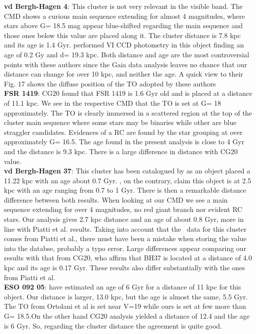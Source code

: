 \documentclass[draft]{aa}
\begin{document}
  \textbf{vd Bergh-Hagen 4}: This cluster is not very relevant in the visible
  band. The CMD shows a curious main sequence extending for almost 4 magnitudes,
  where stars above G= 18.5 mag appear blue-shifted regarding the main sequence
  and those ones below this value are placed along it. The cluster
  distance is 7.8 kpc and its age is 1.4 Gyr. \cite{Carraro_2007}
  performed VI CCD photometry in this object finding an
  age of 0.2 Gy and d= 19.3 kpc. Both distance and age are the most
  controversial points with these authors since the Gaia data analysis leaves no
  chance that our distance can change for over 10 kpc, and neither the age. A
  quick view to their Fig. 17 shows the diffuse position of the TO adopted by
  these authors\\

  \textbf{FSR 1419}: CG20 found that FSR 1419 is 1.6 Gyr old and is placed at a
  distance of 11.1 kpc. We see in the respective CMD that the TO is set at G= 18
  approximately. The TO is clearly immersed in a scattered region at the top of
  the cluster main sequence where some stars may be binaries while other are
  blue straggler candidates. Evidences of a RC are found by the star grouping at
  over approximately G= 16.5. The age found in the present analysis is close to 4
  Gyr and the distance is 9.3 kpc. There is a large difference in distance
  with CG20 value. \\  

  \textbf{vd Bergh-Hagen 37}: This cluster has been catalogued by \cite{Dias_2002}
  as an object placed a 11.22 kpc with an age about 0.7 Gyr. \cite{Piatti_2010},
  on the contrary, claim this object is at 2.5 kpc with an age ranging from 0.7 to
  1 Gyr. There is then a remarkable distance difference between both results. When
  looking at our CMD we see a main sequence extending for over 4 magnitudes, no red
  giant branch nor evident RC stars. Our analysis gives 2.7 kpc distance and 
  an age of about 0.8 Gyr, more in line with Piatti et al. results. Taking into account
  that the~\cite{Dias_2002} data for this cluster comes from Piatti et al.,
  there must have been a mistake when storing the value into the databse, probably a
  typo error. Large differences appear comparing our results with that from CG20, who
  affirm that BH37 is located at a distance of 4.0 kpc and its age is 0.17 Gyr. These
  results also differ substantially with the ones from Piatti et al. \\

  \textbf{ESO 092 05}: \cite{Ortolani_2008} have estimated an
  age of 6 Gyr for a distance of 11 kpc for this object.  Our distance is
  larger, 13.0 kpc, but the age is almost the same, 5.5 Gyr.  The TO from Ortolani et
  al is set near V=19 while ours is set  at few more than G= 18.5.On the other
  hand CG20 analysis yielded a distance of 12.4 and the age is 6
  Gyr. So, regarding the cluster distance the agreement is quite good.\\ 
\end{document}
